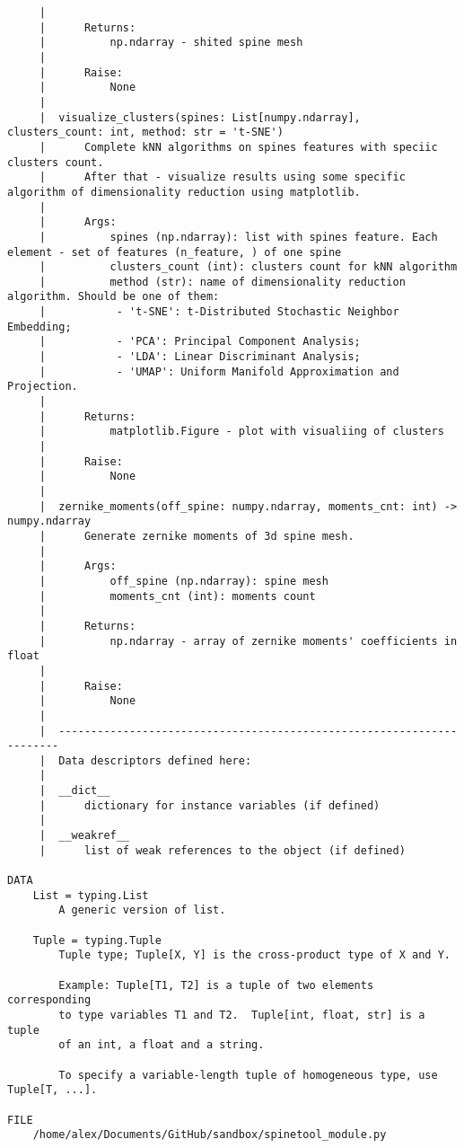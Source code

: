 \begin{lstlisting}
     |      
     |      Returns:
     |          np.ndarray - shited spine mesh
     |      
     |      Raise:
     |          None
     |  
     |  visualize_clusters(spines: List[numpy.ndarray], clusters_count: int, method: str = 't-SNE')
     |      Complete kNN algorithms on spines features with speciic clusters count.
     |      After that - visualize results using some specific algorithm of dimensionality reduction using matplotlib.
     |      
     |      Args:
     |          spines (np.ndarray): list with spines feature. Each element - set of features (n_feature, ) of one spine
     |          clusters_count (int): clusters count for kNN algorithm
     |          method (str): name of dimensionality reduction algorithm. Should be one of them:
     |           - 't-SNE': t-Distributed Stochastic Neighbor Embedding;
     |           - 'PCA': Principal Component Analysis;
     |           - 'LDA': Linear Discriminant Analysis;
     |           - 'UMAP': Uniform Manifold Approximation and Projection.
     |      
     |      Returns:
     |          matplotlib.Figure - plot with visualiing of clusters
     |      
     |      Raise:
     |          None
     |  
     |  zernike_moments(off_spine: numpy.ndarray, moments_cnt: int) -> numpy.ndarray
     |      Generate zernike moments of 3d spine mesh.
     |      
     |      Args:
     |          off_spine (np.ndarray): spine mesh
     |          moments_cnt (int): moments count
     |      
     |      Returns:
     |          np.ndarray - array of zernike moments' coefficients in float
     |      
     |      Raise:
     |          None
     |  
     |  ----------------------------------------------------------------------
     |  Data descriptors defined here:
     |  
     |  __dict__
     |      dictionary for instance variables (if defined)
     |  
     |  __weakref__
     |      list of weak references to the object (if defined)

DATA
    List = typing.List
        A generic version of list.
    
    Tuple = typing.Tuple
        Tuple type; Tuple[X, Y] is the cross-product type of X and Y.
        
        Example: Tuple[T1, T2] is a tuple of two elements corresponding
        to type variables T1 and T2.  Tuple[int, float, str] is a tuple
        of an int, a float and a string.
        
        To specify a variable-length tuple of homogeneous type, use Tuple[T, ...].

FILE
    /home/alex/Documents/GitHub/sandbox/spinetool_module.py	
\end{lstlisting}

